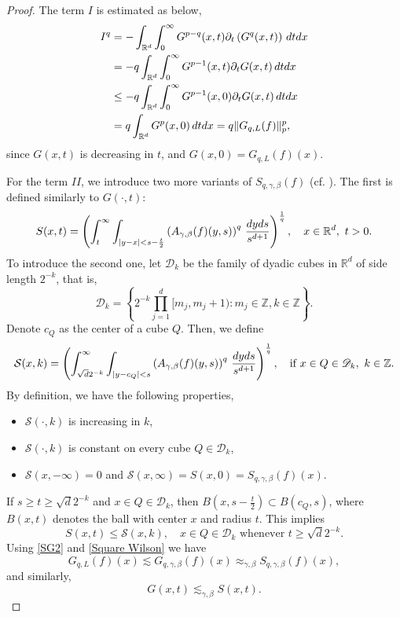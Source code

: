 \documentclass[oneside,english,a4wide]{amsart}
\numberwithin{equation}{section}
\numberwithin{figure}{section}
\theoremstyle{plain}
\theoremstyle{plain}
\theoremstyle{definition}
\theoremstyle{plain}
\theoremstyle{remark}
\theoremstyle{definition}
\theoremstyle{remark}
\theoremstyle{definition}
\newcommand{\real}{{\mathbb R}}
\newcommand{\ent}{{\mathbb Z}}
\newcommand{\D}{{\mathscr{D}}}
\renewcommand{\S}{\mathcal{S}}
\newcommand{\8}{+\infty}
\renewcommand{\1}{\mathbbm{1}}
\newcommand\sk[1]{ \left( #1 \right) }
\newcommand\lk[1]{ \left\{ #1 \right\} }
\renewcommand\d{{\rm d}}
\begin{document}
{\begin{proof}
The term $I$ is estimated as below,
\begin{align*}
I^q & = - \int_{\real^d} \int_{0}^{\infty} G^{p-q}(x,t)\partial_t\sk{ G^q(x, t) }  \, \d t\d x \\
& = -q \int_{\real^d}\int_{0}^{\infty} G^{p-1}(x,t)\partial_t G(x,t) \, \d t\d x  \\
& \leq -q \int_{\real^d}\int_{0}^{\infty} G^{p-1}(x,0)\partial_t G(x,t) \, \d t\d x \\ 
& = q\int_{\real^d}G^p(x,0) \, \d t\d x  = q\| G_{q,L}(f) \|_p^p,
\end{align*}
since $G(x, t)$ is decreasing in $t$, and $G(x, 0) = G_{q,L}(f)(x)$.

For the term $II$, we introduce two more variants of $S_{q, \gamma,\beta}(f) $ (cf. \cite{Xu2022}). The first is defined similarly to $ G(\cdot,t) $:
\[
    S(x,t) = \sk{ \int_{t}^{\infty}\int_{|y-x| <s-\frac{t}{2} } \sk{ A_{\gamma,\beta}(f)(y,s) }^q \,\frac{\d y\d s}{s^{d+1}} }^{\frac{1}{q}},\quad x\in \real^d,\ t>0.
\]
To introduce the second one, let $ \D_k $ be the family of dyadic cubes in $\real^d$ of side length $ 2^{-k} $, that is, 
\[
    \D_k = \lk{ 2^{-k}\prod_{ j = 1 }^d[m_j, m_j+1): m_j \in \ent, k \in \ent }.
\]
Denote $ c_Q $ as the center of a cube $ Q $. Then, we define
\[
    \S(x,k) = \sk{ \int_{\sqrt{d}2^{-k}}^{\infty}  \int_{|y-c_Q|< s} \sk{ A_{\gamma,\beta}(f)(y,s) }^q \,\frac{\d y\d s}{s^{d+1}} }^{\frac{1}{q}}, \quad \text{if } x \in Q \in \D_k,\ k\in \ent .
\]
By definition, we have the following properties,
\begin{itemize}
    \item[(i)] $ \S(\cdot,k) $ is increasing in $ k $,
    \item[(ii)] $ \S(\cdot,k) $ is constant on every cube $ Q \in \D_k $,
    \item[(iii)] $ \S(x,-\infty) = 0 $ and $ \S(x,\infty) = S(x,0) = S_{q, \gamma,\beta}(f)(x) $.
\end{itemize}  
If $ s \geq t \geq \sqrt{d}2^{-k} $ and $ x\in Q \in \D_k $, then $ B(x,s-\frac{t}{2}) \subset B(c_Q,s) $, where $ B(x,t) $ denotes the ball with center $ x $ and radius $ t $. This implies
\[
    S(x,t) \leq \S(x,k), \quad  x \in Q \in \D_k \text{ whenever } t \geq \sqrt{d}2^{-k}.
\]
Using \eqref{SG2} and \eqref{Square Wilson} we have
\[
    G_{q,L}(f)(x) \lesssim G_{q, \gamma,\beta}(f)(x) \approx_{\gamma, \beta} S_{q, \gamma,\beta}(f)(x),
\]
and similarly,
\begin{equation}\label{G_xt-S_xt}
    G(x,t) \lesssim_{\gamma, \beta} S(x,t).
\end{equation}

\end{proof}}
\end{document}
